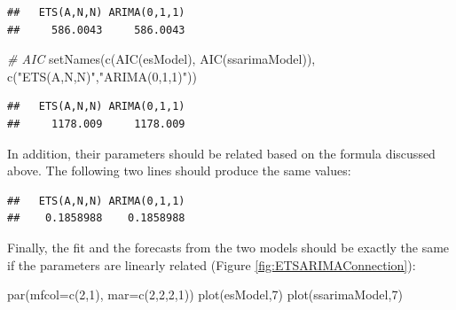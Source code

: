\documentclass[
]{book}
\newenvironment{Shaded}{\begin{snugshade}}{\end{snugshade}}
\newcommand{\AttributeTok}[1]{\textcolor[rgb]{0.77,0.63,0.00}{#1}}
\newcommand{\CommentTok}[1]{\textcolor[rgb]{0.56,0.35,0.01}{\textit{#1}}}
\newcommand{\DecValTok}[1]{\textcolor[rgb]{0.00,0.00,0.81}{#1}}
\newcommand{\FunctionTok}[1]{\textcolor[rgb]{0.00,0.00,0.00}{#1}}
\newcommand{\NormalTok}[1]{#1}
\newcommand{\SpecialCharTok}[1]{\textcolor[rgb]{0.00,0.00,0.00}{#1}}
\newcommand{\StringTok}[1]{\textcolor[rgb]{0.31,0.60,0.02}{#1}}
\theoremstyle{definition}
\theoremstyle{definition}
\theoremstyle{definition}
\theoremstyle{definition}
\theoremstyle{remark}
\begin{document}
\begin{verbatim}
##   ETS(A,N,N) ARIMA(0,1,1) 
##     586.0043     586.0043
\end{verbatim}

\begin{Shaded}
\begin{Highlighting}[]
\CommentTok{\# AIC}
\FunctionTok{setNames}\NormalTok{(}\FunctionTok{c}\NormalTok{(}\FunctionTok{AIC}\NormalTok{(esModel), }\FunctionTok{AIC}\NormalTok{(ssarimaModel)),}
         \FunctionTok{c}\NormalTok{(}\StringTok{"ETS(A,N,N)"}\NormalTok{,}\StringTok{"ARIMA(0,1,1)"}\NormalTok{))}
\end{Highlighting}
\end{Shaded}

\begin{verbatim}
##   ETS(A,N,N) ARIMA(0,1,1) 
##     1178.009     1178.009
\end{verbatim}

In addition, their parameters should be related based on the formula discussed above. The following two lines should produce the same values:

\begin{Shaded}
\end{Shaded}

\begin{verbatim}
##   ETS(A,N,N) ARIMA(0,1,1) 
##    0.1858988    0.1858988
\end{verbatim}

Finally, the fit and the forecasts from the two models should be exactly the same if the parameters are linearly related (Figure \ref{fig:ETSARIMAConnection}):

\begin{Shaded}
\begin{Highlighting}[]
\FunctionTok{par}\NormalTok{(}\AttributeTok{mfcol=}\FunctionTok{c}\NormalTok{(}\DecValTok{2}\NormalTok{,}\DecValTok{1}\NormalTok{), }\AttributeTok{mar=}\FunctionTok{c}\NormalTok{(}\DecValTok{2}\NormalTok{,}\DecValTok{2}\NormalTok{,}\DecValTok{2}\NormalTok{,}\DecValTok{1}\NormalTok{))}
\FunctionTok{plot}\NormalTok{(esModel,}\DecValTok{7}\NormalTok{)}
\FunctionTok{plot}\NormalTok{(ssarimaModel,}\DecValTok{7}\NormalTok{)}
\end{Highlighting}
\end{Shaded}
\end{document}
